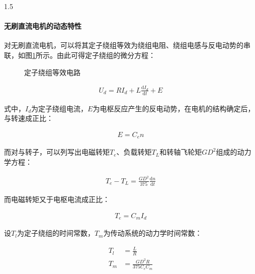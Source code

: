\documentclass[a4paper,11pt]{ctexart}
\newcommand{\diff}{\text{d}}
\newenvironment{shrinkeq}[2]
{
	\bgroup
	\addtolength\abovedisplayshortskip{#1}
	\addtolength\abovedisplayskip{#1}
	\addtolength\belowdisplayshortskip{#2}
	\addtolength\belowdisplayskip{#2}
}
{
	\egroup
	\ignorespacesafterend
}
\begin{document}
\begin{spacing}{1.5}
\paragraph{无刷直流电机的动态特性}
对无刷直流电机，可以将其定子绕组等效为绕组电阻、绕组电感与反电动势的串联，如图\ref{firgue:定子绕组等效电路}所示。由此可得定子绕组的微分方程：
\begin{figure}[h]
	\centering
	\caption{定子绕组等效电路}\label{firgue:定子绕组等效电路}
\end{figure}
\begin{shrinkeq}{-1.5ex}{-2.5ex}
	\begin{align}
	U_d = RI_d+L\frac{\diff I_d}{\diff t}+E
	\end{align}
\end{shrinkeq}
式中，$I_d$为定子绕组电流，$E$为电枢反应产生的反电动势，在电机的结构确定后，与转速成正比：
\begin{shrinkeq}{-1.5ex}{-2.5ex}
	\begin{align}
	E = C_{e}n
	\end{align}
\end{shrinkeq}
\par
而对与转子，可以列写出电磁转矩$T_e$、负载转矩$T_L$和转轴飞轮矩$GD^2$组成的动力学方程：
\begin{shrinkeq}{-1.5ex}{-2.5ex}
	\begin{align}
	T_e-T_L = \frac{GD^2}{375}\frac{\diff n}{\diff t}
	\end{align}
\end{shrinkeq}
而电磁转矩又于电枢电流成正比：
\begin{shrinkeq}{-1.5ex}{-2.5ex}
	\begin{align}
	T_e = C_mI_d
	\end{align}
\end{shrinkeq}
设$T_l$为定子绕组的时间常数，$T_m$为传动系统的动力学时间常数：
\begin{shrinkeq}{-1ex}{-1ex}
	\begin{align}
	T_l&=\frac{L}{R}\\
	T_m&=\frac{GD^2R}{375C_eC_m}

\end{align}
\end{shrinkeq}
\end{spacing}
\end{document}
